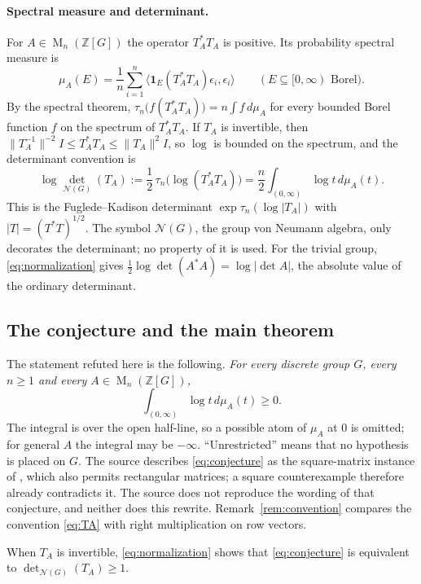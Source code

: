 \documentclass[11pt]{article}
\theoremstyle{remark}
\numberwithin{equation}{section}
\newcommand{\Z}{\mathbb Z}
\newcommand{\Mat}{\operatorname{M}}
\newcommand{\N}{\mathcal N}
\begin{document}
\paragraph{Spectral measure and determinant.}
For $A\in\Mat_n(\Z[G])$ the operator $T_A^*T_A$ is positive. Its probability spectral measure is
\[
 \mu_A(E)=\frac1n\sum_{i=1}^n\langle \mathbf1_E(T_A^*T_A)\epsilon_i,\epsilon_i\rangle
 \qquad(E\subseteq[0,\infty)\text{ Borel}).
\]
By the spectral theorem, $\tau_n\bigl(f(T_A^*T_A)\bigr)=n\int f\,d\mu_A$ for every bounded Borel function $f$ on the spectrum of $T_A^*T_A$. If $T_A$ is invertible, then $\|T_A^{-1}\|^{-2}I\le T_A^*T_A\le\|T_A\|^2I$, so $\log$ is bounded on the spectrum, and the determinant convention is
\begin{equation}\label{eq:normalization}
 \log\det_{\N(G)}(T_A)
 :=\frac12\,\tau_n\bigl(\log(T_A^*T_A)\bigr)
 =\frac n2\int_{(0,\infty)}\log t\,d\mu_A(t).
\end{equation}
This is the Fuglede--Kadison determinant $\exp\tau_n(\log|T_A|)$ with $|T|=(T^*T)^{1/2}$. The symbol $\N(G)$, the group von Neumann algebra, only decorates the determinant; no property of it is used. For the trivial group, \eqref{eq:normalization} gives $\frac12\log\det(A^*A)=\log|\det A|$, the absolute value of the ordinary determinant.

\subsection{The conjecture and the main theorem}

The statement refuted here is the following. \emph{For every discrete group $G$, every $n\ge1$ and every $A\in\Mat_n(\Z[G])$,}
\begin{equation}\label{eq:conjecture}
 \int_{(0,\infty)}\log t\,d\mu_A(t)\ge0.
\end{equation}
The integral is over the open half-line, so a possible atom of $\mu_A$ at $0$ is omitted; for general $A$ the integral may be $-\infty$. ``Unrestricted'' means that no hypothesis is placed on $G$. The source describes \eqref{eq:conjecture} as the square-matrix instance of \cite[Conjecture 13.2]{Luck2002}, which also permits rectangular matrices; a square counterexample therefore already contradicts it. The source does not reproduce the wording of that conjecture, and neither does this rewrite. Remark~\ref{rem:convention} compares the convention \eqref{eq:TA} with right multiplication on row vectors.

When $T_A$ is invertible, \eqref{eq:normalization} shows that \eqref{eq:conjecture} is equivalent to $\det_{\N(G)}(T_A)\ge1$.
\end{document}
